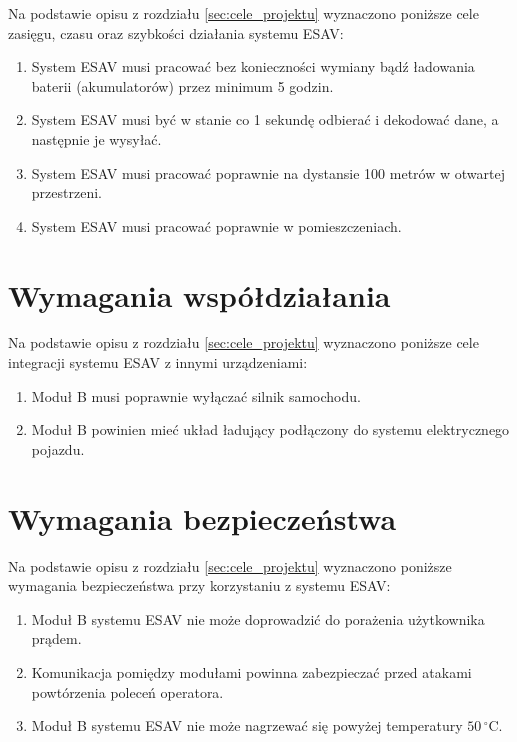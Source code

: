 Na podstawie opisu z rozdziału \ref{sec:cele_projektu} wyznaczono poniższe cele zasięgu, czasu oraz szybkości działania systemu ESAV:

\begin{enumerate}
\item System ESAV musi pracować bez konieczności wymiany bądź ładowania baterii (akumulatorów) przez minimum 5 godzin.
\item System ESAV musi być w stanie co 1 sekundę odbierać i dekodować dane, a następnie je wysyłać.
\item System ESAV musi pracować poprawnie na dystansie 100 metrów w otwartej przestrzeni.
\item System ESAV musi pracować poprawnie w pomieszczeniach.
\end{enumerate}


\section{Wymagania współdziałania}
\label{sec:wymagania_wspoldzialania}

Na podstawie opisu z rozdziału \ref{sec:cele_projektu} wyznaczono poniższe cele integracji systemu ESAV z innymi urządzeniami:

\begin{enumerate}
\item Moduł B musi poprawnie wyłączać silnik samochodu.
\item Moduł B powinien mieć układ ładujący podłączony do systemu elektrycznego pojazdu.
\end{enumerate}


\section{Wymagania bezpieczeństwa}
\label{sec:wymagania_bezpieczenstwa}

Na podstawie opisu z rozdziału \ref{sec:cele_projektu} wyznaczono poniższe wymagania bezpieczeństwa przy korzystaniu z systemu ESAV:
\begin{enumerate}
\item Moduł B systemu ESAV nie może doprowadzić do porażenia użytkownika prądem.
\item Komunikacja pomiędzy modułami powinna zabezpieczać przed atakami powtórzenia poleceń operatora.
\item Moduł B systemu ESAV nie może nagrzewać się powyżej temperatury $50\,^{\circ}\mathrm{C}$.
\end{enumerate}

